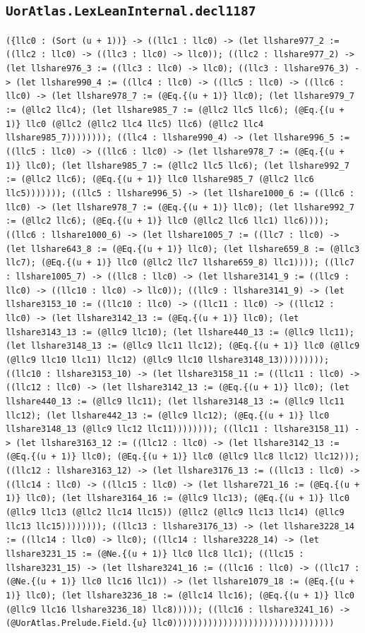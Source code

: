 \documentclass[11pt]{article}
\begin{document}
\subsection*{\texttt{UorAtlas.LexLeanInternal.decl1187}}
\noindent\texttt{(\{llc0 : (Sort (u + 1))\} -> ((llc1 : llc0) -> (let llshare977\_2 := ((llc2 : llc0) -> ((llc3 : llc0) -> llc0)); ((llc2 : llshare977\_2) -> (let llshare976\_3 := ((llc3 : llc0) -> llc0); ((llc3 : llshare976\_3) -> (let llshare990\_4 := ((llc4 : llc0) -> ((llc5 : llc0) -> ((llc6 : llc0) -> (let llshare978\_7 := (@Eq.\{(u + 1)\} llc0); (let llshare979\_7 := (@llc2 llc4); (let llshare985\_7 := (@llc2 llc5 llc6); (@Eq.\{(u + 1)\} llc0 (@llc2 (@llc2 llc4 llc5) llc6) (@llc2 llc4 llshare985\_7)))))))); ((llc4 : llshare990\_4) -> (let llshare996\_5 := ((llc5 : llc0) -> ((llc6 : llc0) -> (let llshare978\_7 := (@Eq.\{(u + 1)\} llc0); (let llshare985\_7 := (@llc2 llc5 llc6); (let llshare992\_7 := (@llc2 llc6); (@Eq.\{(u + 1)\} llc0 llshare985\_7 (@llc2 llc6 llc5))))))); ((llc5 : llshare996\_5) -> (let llshare1000\_6 := ((llc6 : llc0) -> (let llshare978\_7 := (@Eq.\{(u + 1)\} llc0); (let llshare992\_7 := (@llc2 llc6); (@Eq.\{(u + 1)\} llc0 (@llc2 llc6 llc1) llc6)))); ((llc6 : llshare1000\_6) -> (let llshare1005\_7 := ((llc7 : llc0) -> (let llshare643\_8 := (@Eq.\{(u + 1)\} llc0); (let llshare659\_8 := (@llc3 llc7); (@Eq.\{(u + 1)\} llc0 (@llc2 llc7 llshare659\_8) llc1)))); ((llc7 : llshare1005\_7) -> ((llc8 : llc0) -> (let llshare3141\_9 := ((llc9 : llc0) -> ((llc10 : llc0) -> llc0)); ((llc9 : llshare3141\_9) -> (let llshare3153\_10 := ((llc10 : llc0) -> ((llc11 : llc0) -> ((llc12 : llc0) -> (let llshare3142\_13 := (@Eq.\{(u + 1)\} llc0); (let llshare3143\_13 := (@llc9 llc10); (let llshare440\_13 := (@llc9 llc11); (let llshare3148\_13 := (@llc9 llc11 llc12); (@Eq.\{(u + 1)\} llc0 (@llc9 (@llc9 llc10 llc11) llc12) (@llc9 llc10 llshare3148\_13))))))))); ((llc10 : llshare3153\_10) -> (let llshare3158\_11 := ((llc11 : llc0) -> ((llc12 : llc0) -> (let llshare3142\_13 := (@Eq.\{(u + 1)\} llc0); (let llshare440\_13 := (@llc9 llc11); (let llshare3148\_13 := (@llc9 llc11 llc12); (let llshare442\_13 := (@llc9 llc12); (@Eq.\{(u + 1)\} llc0 llshare3148\_13 (@llc9 llc12 llc11)))))))); ((llc11 : llshare3158\_11) -> (let llshare3163\_12 := ((llc12 : llc0) -> (let llshare3142\_13 := (@Eq.\{(u + 1)\} llc0); (@Eq.\{(u + 1)\} llc0 (@llc9 llc8 llc12) llc12))); ((llc12 : llshare3163\_12) -> (let llshare3176\_13 := ((llc13 : llc0) -> ((llc14 : llc0) -> ((llc15 : llc0) -> (let llshare721\_16 := (@Eq.\{(u + 1)\} llc0); (let llshare3164\_16 := (@llc9 llc13); (@Eq.\{(u + 1)\} llc0 (@llc9 llc13 (@llc2 llc14 llc15)) (@llc2 (@llc9 llc13 llc14) (@llc9 llc13 llc15)))))))); ((llc13 : llshare3176\_13) -> (let llshare3228\_14 := ((llc14 : llc0) -> llc0); ((llc14 : llshare3228\_14) -> (let llshare3231\_15 := (@Ne.\{(u + 1)\} llc0 llc8 llc1); ((llc15 : llshare3231\_15) -> (let llshare3241\_16 := ((llc16 : llc0) -> ((llc17 : (@Ne.\{(u + 1)\} llc0 llc16 llc1)) -> (let llshare1079\_18 := (@Eq.\{(u + 1)\} llc0); (let llshare3236\_18 := (@llc14 llc16); (@Eq.\{(u + 1)\} llc0 (@llc9 llc16 llshare3236\_18) llc8))))); ((llc16 : llshare3241\_16) -> (@UorAtlas.Prelude.Field.\{u\} llc0))))))))))))))))))))))))))))))))}\par
\end{document}
